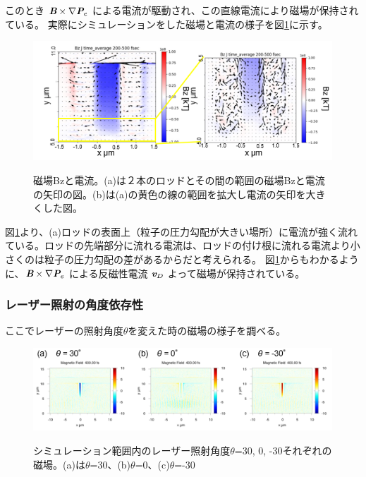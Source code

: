 \documentclass[a4paper,11pt,titlepage]{jarticle}
\numberwithin{equation}{section} %
\begin{document}
  このとき $\textit{\textbf{B}} \times \nabla \textit{\textbf{P}}_e$ による電流が駆動され、この直線電流により磁場が保持されている。
  実際にシミュレーションをした磁場と電流の様子を図\ref{fig:4-2-7}に示す。
  
  \begin{figure}[H]
    \begin{center}
      \includegraphics[scale=1]{./image/4-17-2rod.png}
      \label{fig:4-2-7}
      \caption{磁場Bzと電流。(a)は２本のロッドとその間の範囲の磁場Bzと電流の矢印の図。(b)は(a)の黄色の線の範囲を拡大し電流の矢印を大きくした図。}
    \end{center}
  \end{figure}
  
  図\ref{fig:4-2-7}より、(a)ロッドの表面上（粒子の圧力勾配が大きい場所）に電流が強く流れている。ロッドの先端部分に流れる電流は、ロッドの付け根に流れる電流より小さくのは粒子の圧力勾配の差があるからだと考えられる。
  図\ref{fig:4-2-7}からもわかるように、$\textit{\textbf{B}} \times \nabla \textit{\textbf{P}}_e$ による反磁性電流 $\textit{\textbf{v}}_D$ よって磁場が保持されている。


  \subsubsection{レーザー照射の角度依存性}
  ここでレーザーの照射角度$ \theta $を変えた時の磁場の様子を調べる。
  
  \begin{figure}[H]
    \begin{center}
      \includegraphics[scale=1]{./image/4-19-2rod.png}
      \label{fig:4-4-3}
      \caption{シミュレーション範囲内のレーザー照射角度$\theta$=30, 0, -30それぞれの磁場。(a)は$\theta$=30、(b)$\theta$=0、(c)$\theta$=-30}
    \end{center}
  \end{figure}
  
\end{document}
